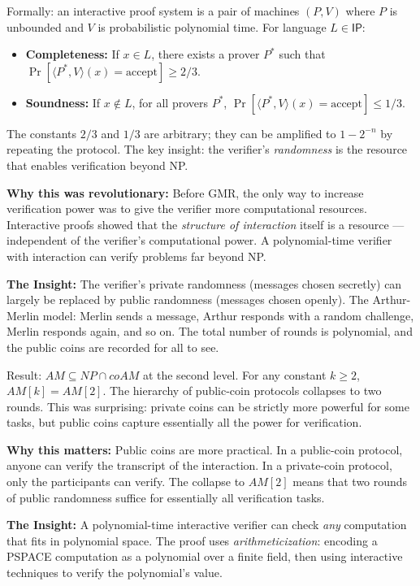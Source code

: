 Formally: an interactive proof system is a pair of machines $(P, V)$ where $P$ is unbounded and $V$ is probabilistic polynomial time. For language $L \in \mathsf{IP}$:
\begin{itemize}
\item \textbf{Completeness:} If $x \in L$, there exists a prover $P^*$ such that $\Pr[\langle P^*, V \rangle(x) = \text{accept}] \ge 2/3$.
\item \textbf{Soundness:} If $x \notin L$, for all provers $P^*$, $\Pr[\langle P^*, V \rangle(x) = \text{accept}] \le 1/3$.
\end{itemize}
The constants $2/3$ and $1/3$ are arbitrary; they can be amplified to $1 - 2^{-n}$ by repeating the protocol. The key insight: the verifier's \emph{randomness} is the resource that enables verification beyond NP.

\textbf{Why this was revolutionary:} Before GMR, the only way to increase verification power was to give the verifier more computational resources. Interactive proofs showed that the \emph{structure of interaction} itself is a resource --- independent of the verifier's computational power. A polynomial-time verifier with interaction can verify problems far beyond NP.

\textbf{The Insight:} The verifier's private randomness (messages chosen secretly) can largely be replaced by public randomness (messages chosen openly). The Arthur-Merlin model: Merlin sends a message, Arthur responds with a random challenge, Merlin responds again, and so on. The total number of rounds is polynomial, and the public coins are recorded for all to see.

Result: $AM \subseteq NP \cap coAM$ at the second level. For any constant $k \ge 2$, $AM[k] = AM[2]$. The hierarchy of public-coin protocols collapses to two rounds. This was surprising: private coins can be strictly more powerful for some tasks, but public coins capture essentially all the power for verification.

\textbf{Why this matters:} Public coins are more practical. In a public-coin protocol, anyone can verify the transcript of the interaction. In a private-coin protocol, only the participants can verify. The collapse to $AM[2]$ means that two rounds of public randomness suffice for essentially all verification tasks.

\textbf{The Insight:} A polynomial-time interactive verifier can check \emph{any} computation that fits in polynomial space. The proof uses \emph{arithmeticization}: encoding a PSPACE computation as a polynomial over a finite field, then using interactive techniques to verify the polynomial's value.

